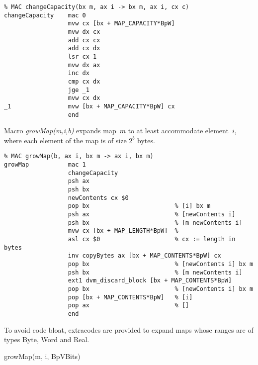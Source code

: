 {\small
\begin{verbatim}
% MAC changeCapacity(bx m, ax i -> bx m, ax i, cx c)
changeCapacity    mac 0
                  mvw cx [bx + MAP_CAPACITY*BpW]
                  mvw dx cx
                  add cx cx
                  add cx dx
                  lsr cx 1
                  mvw dx ax
                  inc dx
                  cmp cx dx
                  jge _1
                  mvw cx dx
_1                mvw [bx + MAP_CAPACITY*BpW] cx
                  end
\end{verbatim}}

Macro \emph{growMap(m,i,b)} expands map~$m$ to at least accommodate element~$i$, where each element of the map is of size $2^b$ bytes.
\begin{tabbing}
\indents
{}
\fin
\end{tabbing}

{\small
\begin{verbatim}
% MAC growMap(b, ax i, bx m -> ax i, bx m)
growMap           mac 1
                  changeCapacity
                  psh ax
                  psh bx
                  newContents cx $0
                  pop bx                        % [i] bx m
                  psh ax                        % [newContents i]
                  psh bx                        % [m newContents i]
                  mvw cx [bx + MAP_LENGTH*BpW]  %
                  asl cx $0                     % cx := length in bytes
                  inv copyBytes ax [bx + MAP_CONTENTS*BpW] cx
                  pop bx                        % [newContents i] bx m
                  psh bx                        % [m newContents i]
                  ext1 dvm_discard_block [bx + MAP_CONTENTS*BpW]
                  pop bx                        % [newContents i] bx m
                  pop [bx + MAP_CONTENTS*BpW]   % [i]
                  pop ax                        % []
                  end
\end{verbatim}}

To avoid code bloat, extracodes are provided to expand maps whose ranges are of types Byte, Word and Real.
\begin{tabbing}
\indents
{}
 {growMap(m, i, BpVBits)}
\end{tabbing}
\vspace{-17pt}

